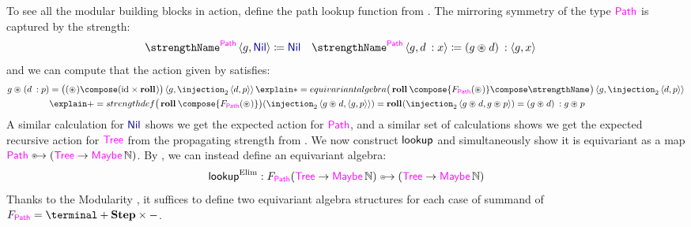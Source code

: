 \begin{example}
  To see all the modular building blocks in action, define the path lookup function
  from . The mirroring symmetry of the type
  $\TreePath$ is captured by the strength:
  \begin{align*}
    \strength[\TreePath]\pair g\Nil &\definedby \Nil
    &
    \strength[\TreePath]\pair g{d \:: x} &\definedby (g \act d) \:: \pair g x
  \end{align*}
  and we can compute that the action given by
  satisfies:
  \begin{align*}
    g \act (d \:: p) &=
    \big((\act) \compose (\id \times \roll)\big) \pair g{\injection_2\pair{d}{p}}
    \explain*={equivariant algebra}
    \big(\roll\compose {\struct[\TreePath](\act)} \compose \strength \big)\pair g{\injection_2\pair{d}{p}} \\&
    \explain+={strength def}
    \big(\roll\compose {\struct[\TreePath](\act)}\big)(\injection_2\pair{g \act d}{\pair g p}) =
    \roll (\injection_2\pair{g \act d}{g \act p}) =
    (g \act d) \:: g \act p
    \end{align*}
  A similar calculation for $\Nil$ shows we get the expected action
  for $\TreePath$, and a similar set of calculations shows we get the
  expected recursive action for $\Tree$ from the propagating strength
  from .
  We now construct $\mathsf{lookup}$ and simultaneously show it is
  equivariant as a map \(
    \TreePath \equito (\Tree \to \Maybe\naturals)
  \).
  By , we can instead define an equivariant algebra:
  \[
    \lookupElim : \struct[\TreePath](\Tree \to \Maybe\naturals) \equito
    (\Tree \to \Maybe\naturals)
  \]
  Thanks to the Modularity , it suffices to define two
  equivariant algebra structures for each case of summand of
  $\struct[\TreePath] = \terminal \amalg \TreeLabel \times {-}$.


\end{example}
